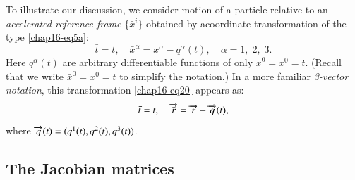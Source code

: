 To illustrate  our  discussion, we  consider motion of a particle relative to an  \textsl{accelerated reference frame} $\{\bar{x}^i\}$ obtained by  acoordinate transformation of the type \eqref{chap16-eq5a}: 
\begin{equation}
\bar{t}=t, \quad \bar{x}^\alpha =x^\alpha - q^\alpha(t), \quad \alpha=1,\;2,\;3.\label{chap16-eq20}
\end{equation} 
Here  $q^\alpha (t)$ are arbitrary differentiable functions of only $\bar{x}^0=x^0=t$. (Recall that  we write $\bar{x}^0=x^0=t$ to simplify the notation.) In a more familiar \textsl{3-vector notation}, this transformation \eqref{chap16-eq20} appears as:
\begin{equation}
\bar{t}=t, \quad  {\overrightarrow{\bar{r}}}=\overrightarrow{r} - \overrightarrow{q}(t),\label{chap16-eq21}
\end{equation}
where $\overrightarrow{q}(t)=(q^1(t),q^2(t),q^3(t))$.

\subsection{The Jacobian matrices}\label{chap16-sec6.1}

